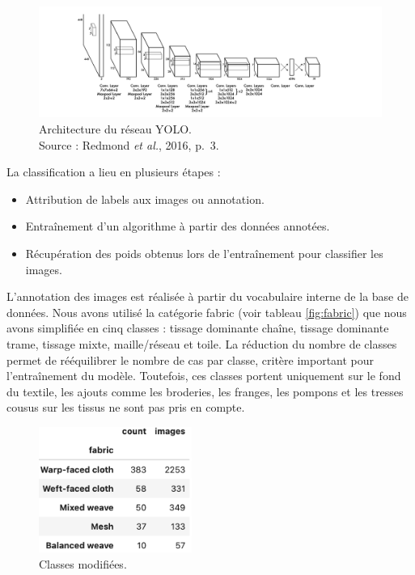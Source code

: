  \begin{figure}[!h]
	\begin{center}
		\includegraphics[width=18cm]{../images/YOLO_archi.png}
		\caption{Architecture du réseau YOLO. \\ Source : Redmond \textit{et al.}, 2016, p.~3.}
		\label{fig:YOLO}
	 \end{center}
\end{figure}


\noindent La classification a lieu en plusieurs étapes : 
\begin{itemize}
	\item Attribution de labels aux images ou annotation.
	\item Entraînement d'un algorithme à partir des données annotées.
	\item Récupération des poids obtenus lors de l'entraînement pour classifier les images.
\end{itemize}

\noindent L'annotation des images est réalisée à partir du vocabulaire interne de la base de données. Nous avons utilisé la catégorie \og fabric \fg \:(voir tableau \ref{fig:fabric}) que nous avons simplifiée en cinq classes : tissage dominante chaîne, tissage dominante trame, tissage mixte, maille/réseau et toile. La réduction du nombre de classes permet de rééquilibrer le nombre de cas par classe, critère important pour l'entraînement du modèle. Toutefois, ces classes portent uniquement sur le fond du textile, les ajouts comme les broderies, les franges, les pompons et les tresses cousus sur les tissus ne sont pas pris en compte.

\begin{figure}
    \centering
    \includegraphics[width=5cm]{../images/fabricmodif.png}
    \caption{Classes modifiées.}
    \label{fig:classes_modif}
\end{figure}

